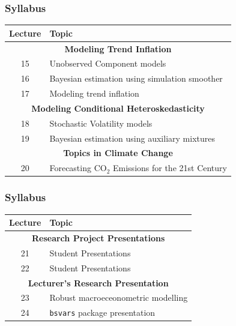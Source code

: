 \documentclass[notes,blackandwhite,mathsans]{beamer}
\begin{document}
\begin{frame}
\frametitle{Syllabus}

\begin{center}
\begin{tabular}{ c l}
\toprule 
Lecture & Topic \\
\midrule
\multicolumn{2}{c}{\textbf{Modeling Trend Inflation}}\\
15  & {\color{mcxs2}Unobserved Component models} \\
16  & {\color{mcxs2}Bayesian estimation using simulation smoother} \\
17  & {\color{mcxs2}Modeling trend inflation} \\[1ex]
\multicolumn{2}{c}{\textbf{Modeling Conditional Heteroskedasticity}}\\
18 & {\color{mcxs2}Stochastic Volatility models} \\
19  & {\color{mcxs2}Bayesian estimation using auxiliary mixtures} \\[1ex]
\multicolumn{2}{c}{\textbf{Topics in Climate Change}}\\
20  & {\color{mcxs2}Forecasting CO$_2$ Emissions for the 21st Century} \\[1ex]
\bottomrule
\end{tabular}
\end{center}
\end{frame}



\begin{frame}
\frametitle{Syllabus}

\begin{center}
\begin{tabular}{ c l}
\toprule 
Lecture & Topic \\
\midrule
\multicolumn{2}{c}{\textbf{Research Project Presentations}}\\
21  & {\color{mcxs2}Student Presentations} \\
22  & {\color{mcxs2}Student Presentations} \\[1ex]
\multicolumn{2}{c}{\textbf{Lecturer's Research Presentation}}\\
23  & {\color{mcxs2}Robust macroeceonometric modelling}\\
24  & {\color{mcxs2}\texttt{bsvars} package presentation} \\[1ex]
\bottomrule
\end{tabular}
\end{center}
\end{frame}
\end{document}
